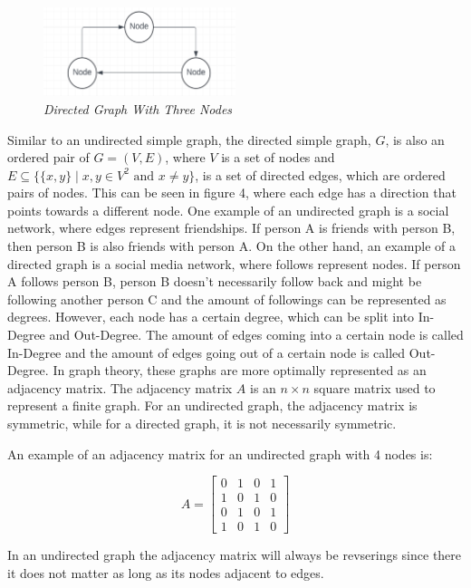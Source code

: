 \documentclass[12pt]{article}
\begin{document}
\begin{figure}[h!]

  \centering
  \includegraphics[width=0.5\textwidth]{Screenshot 2024-06-05 112230.png}
    \caption{\textit{Directed Graph With Three Nodes} }
\end{figure}
Similar to an undirected simple graph, the directed simple graph, \( G \), is also an ordered pair of \( G = (V, E) \), where \( V \) is a set of nodes and \( E \subseteq \{\{x, y\} \mid x, y \in V^2 \text{ and } x \neq y\} \), is a set of directed edges, which are ordered pairs of nodes. This can be seen in figure 4, where each edge has a direction that points towards a different node. One example of an undirected graph is a social network, where edges represent friendships. If person A is friends with person B, then person B is also friends with person A. On the other hand, an example of a directed graph is a social media network, where follows represent nodes. If person A follows person B, person B doesn’t necessarily follow back and might be following another person C and the amount of followings can be represented as degrees. However, each node has a certain degree, which can be split into In-Degree and Out-Degree. The amount of edges coming into a certain node is called In-Degree and the amount of edges going out of a certain node is called Out-Degree.
In graph theory, these graphs are more optimally represented as an adjacency matrix. The adjacency matrix \( A \) is an \( n \times n \) square matrix used to represent a finite graph. For an undirected graph, the adjacency matrix is symmetric, while for a directed graph, it is not necessarily symmetric.

An example of an adjacency matrix for an undirected graph with 4 nodes is:

\[
A = \begin{bmatrix}
0 & 1 & 0 & 1 \\
1 & 0 & 1 & 0 \\
0 & 1 & 0 & 1 \\
1 & 0 & 1 & 0
\end{bmatrix}
\]

In an undirected graph the adjacency matrix will always be revserings since there it does not matter as long as its nodes adjacent to edges.
\end{document}
